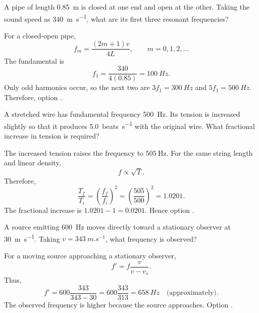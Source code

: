 \begin{quizquestion}[
  id=phy104-wave-032,
  topic=waves-and-sound,
  difficulty=applied,
  marks=2,
  correct=C,
  tags={closed-pipe,resonance,harmonics},
  outcome={Calculate the first resonances of a closed pipe}
]
  A pipe of length \SI{0.85}{m} is closed at one end and open at the other. Taking the sound speed as \SI{340}{m.s^{-1}}, what are its first three resonant frequencies?
\end{quizquestion}
\begin{quizsolution}
  For a closed-open pipe,
    \[
      f_m=\frac{(2m+1)v}{4L},\qquad m=0,1,2,\ldots
    \]
    The fundamental is
    \[
      f_1=\frac{340}{4(0.85)}=\SI{100}{Hz}.
    \]
    Only odd harmonics occur, so the next two are \(3f_1=\SI{300}{Hz}\) and \(5f_1=\SI{500}{Hz}\). Therefore, option \textbf{\quizcorrectletter}.
\end{quizsolution}

\begin{quizquestion}[
  id=phy104-wave-033,
  topic=waves-and-sound,
  difficulty=applied,
  marks=2,
  correct=D,
  tags={beats,string,tension,frequency},
  outcome={Relate beat frequency to a fractional tension change}
]
  A stretched wire has fundamental frequency \SI{500}{Hz}. Its tension is increased slightly so that it produces \SI{5.0}{beats.s^{-1}} with the original wire. What fractional increase in tension is required?
\end{quizquestion}
\begin{quizsolution}
  The increased tension raises the frequency to \(505\ \mathrm{Hz}\). For the same string length and linear density,
    \[
      f\propto\sqrt{T}.
    \]
    Therefore,
    \[
      \frac{T_f}{T_i}={\left(\frac{f_f}{f_i}\right)}^2
      ={\left(\frac{505}{500}\right)}^2=1.0201.
    \]
    The fractional increase is \(1.0201-1=0.0201\). Hence option \textbf{\quizcorrectletter}.
\end{quizsolution}

\begin{quizquestion}[
  id=phy104-wave-034,
  topic=waves-and-sound,
  difficulty=applied,
  marks=2,
  correct=A,
  tags={doppler-effect,moving-source,frequency},
  outcome={Calculate the Doppler shift from a moving source}
]
  A source emitting \SI{600}{Hz} moves directly toward a stationary observer at \SI{30}{m.s^{-1}}. Taking \(v=\SI{343}{m.s^{-1}}\), what frequency is observed?
\end{quizquestion}
\begin{quizsolution}
  For a moving source approaching a stationary observer,
    \[
      f'=f\frac{v}{v-v_s}.
    \]
    Thus,
    \[
      f'=600\frac{343}{343-30}
      =600\frac{343}{313}
      =\SI{658}{Hz}\quad\text{(approximately)}.
    \]
    The observed frequency is higher because the source approaches. Option \textbf{\quizcorrectletter}.
\end{quizsolution}


